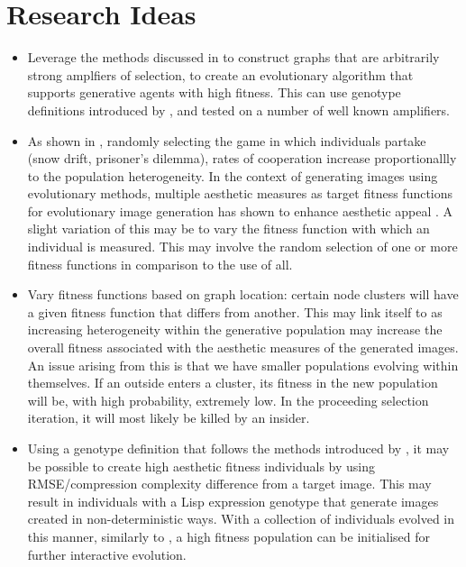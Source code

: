 \documentclass[10pt,a4paper]{article}
\begin{document}
\section{Research Ideas}
\begin{itemize}
	\item Leverage the methods discussed in \cite{graph amplifiers} to construct graphs that are arbitrarily strong amplfiers of selection, to create an evolutionary algorithm that supports generative agents with high fitness.
	This can use genotype definitions introduced by \cite{sims}, and tested on a number of well known amplifiers.
	
	\item As shown in \cite{mixed games}, randomly selecting the game in which individuals partake (snow drift, prisoner's dilemma), rates of cooperation increase proportionallly to the population heterogeneity.
	In the context of generating images using evolutionary methods, multiple aesthetic measures as target fitness functions for evolutionary image generation has shown to enhance aesthetic appeal \cite{aesthetic measures}.
	A slight variation of this may be to vary the fitness function with which an individual is measured.
	This may involve the random selection of one or more fitness functions in comparison to the use of all.
	
	\item Vary fitness functions based on graph location: certain node clusters will have a given fitness function that differs from another.
	This may link itself to \cite{mixed games} as increasing heterogeneity within the generative population may increase the overall fitness associated with the aesthetic measures of the generated images.
	An issue arising from this is that we have smaller populations evolving within themselves.
	If an outside enters a cluster, its fitness in the new population will be, with high probability, extremely low.
	In the proceeding selection iteration, it will most likely be killed by an insider.
	
	\item Using a genotype definition that follows the methods introduced by \cite{sims}, it may be possible to create high aesthetic fitness individuals by using RMSE/compression complexity difference from a target image. 
	This may result in individuals with a Lisp expression genotype that generate images created in non-deterministic ways.
	With a collection of individuals evolved in this manner, similarly to \cite{nevar}, a high fitness population can be initialised for further interactive evolution.
\end{itemize}
\end{document}
